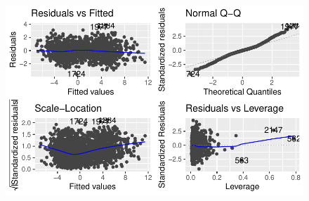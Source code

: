 \documentclass[
  letterpaper,
  DIV=11,
  numbers=noendperiod]{scrartcl}
\begin{document}
\begin{figure}[H]

{\centering \includegraphics{seoul_files/figure-pdf/unnamed-chunk-14-1.pdf}

}

\end{figure}
\end{document}
